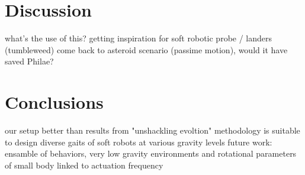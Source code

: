 \documentclass{sig-alternate}
\begin{document}
\section{Discussion}
what's the use of this?
getting inspiration for soft robotic probe / landers (tumbleweed)
come back to asteroid scenario (passime motion), would it have saved Philae?

\section{Conclusions}
our setup better than results from "unshackling evoltion"
methodology is suitable to design diverse gaits of soft robots at various gravity levels
future work: ensamble of behaviors, very low gravity environments and rotational parameters of small body linked to actuation frequency


%
\end{document}
